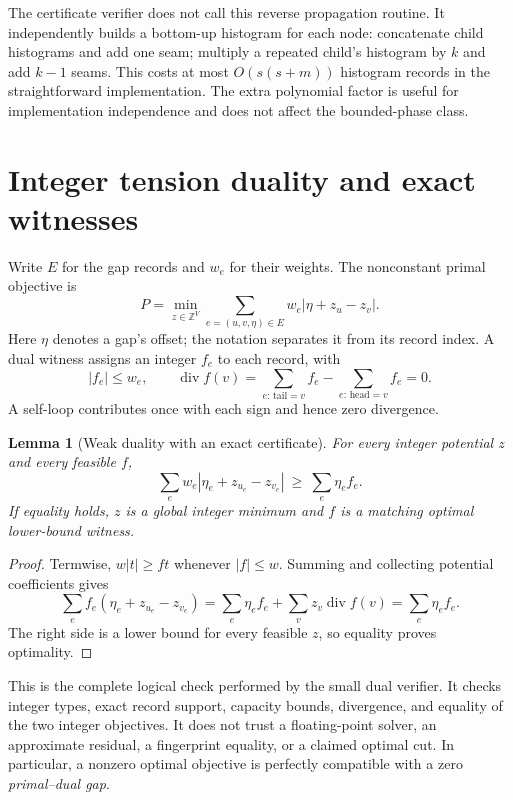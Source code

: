 \documentclass[11pt,letterpaper]{article}
\newtheorem{lemma}[theorem]{Lemma}
\theoremstyle{definition}
\theoremstyle{remark}\newtheorem{remark}[theorem]{Remark}
\newcommand{\Z}{\mathbb Z}
\newcommand{\divg}{\operatorname{div}}
\begin{document}
The certificate verifier does not call this reverse propagation routine.
It independently builds a bottom-up histogram for each node: concatenate
child histograms and add one seam; multiply a repeated child's histogram by
$k$ and add $k-1$ seams. This costs at most $O(s(s+m))$ histogram records in
the straightforward implementation. The extra polynomial factor is useful
for implementation independence and does not affect the bounded-phase class.

\section{Integer tension duality and exact witnesses}
\label{sec:dual}

Write $E$ for the gap records and $w_e$ for their weights. The nonconstant
primal objective is
\[
 P=\min_{z\in\Z^V}\sum_{e=(u,v,\eta)\in E}
                 w_e|\eta+z_u-z_v|.
\]
Here $\eta$ denotes a gap's offset; the notation separates it from its record
index. A dual witness assigns an integer $f_e$ to each record, with
\begin{equation}
 |f_e|\le w_e,\qquad
 \divg f(v)=\sum_{e:\,\text{tail}=v}f_e-
            \sum_{e:\,\text{head}=v}f_e=0.
 \label{eq:dualfeasible}
\end{equation}
A self-loop contributes once with each sign and hence zero divergence.

\begin{lemma}[Weak duality with an exact certificate]
For every integer potential $z$ and every feasible $f$,
\begin{equation}
 \sum_e w_e|\eta_e+z_{u_e}-z_{v_e}|
       \ \ge\ \sum_e \eta_e f_e.
 \label{eq:weakdual}
\end{equation}
If equality holds, $z$ is a global integer minimum and $f$ is a matching
optimal lower-bound witness.
\end{lemma}
\begin{proof}
Termwise, $w|t|\ge ft$ whenever $|f|\le w$. Summing and collecting potential
coefficients gives
\[
 \sum_e f_e(\eta_e+z_{u_e}-z_{v_e})
   =\sum_e \eta_e f_e+\sum_v z_v\divg f(v)
   =\sum_e \eta_e f_e.
\]
The right side is a lower bound for every feasible $z$, so equality proves
optimality.
\end{proof}

This is the complete logical check performed by the small dual verifier.
It checks integer types, exact record support, capacity bounds, divergence,
and equality of the two integer objectives. It does not trust a floating-point
solver, an approximate residual, a fingerprint equality, or a claimed optimal
cut. In particular, a nonzero optimal objective is perfectly compatible with
a zero \emph{primal--dual gap}.
\end{document}
